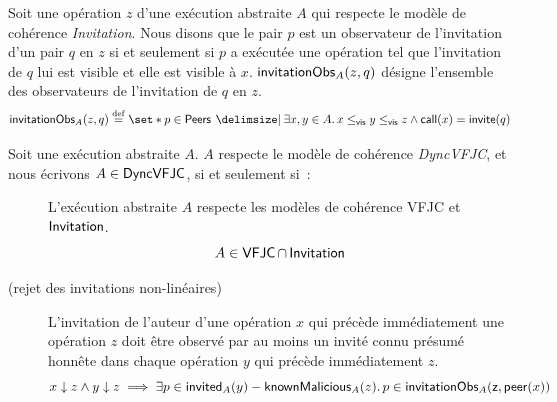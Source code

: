 \begin{definition}\label{def:invitation-obs}
Soit une opération $z$ d'une exécution abstraite $A$ qui respecte le modèle de cohérence \emph{Invitation}.
Nous disons que le pair $p$ est un observateur de l'invitation d'un pair $q$ en $z$ si et seulement si $p$ a exécutée une opération tel que l'invitation de $q$ lui est visible et elle est visible à $x$.
$\operatorname{\mathsf{invitationObs}}_A(z, q)$ désigne l'ensemble des observateurs de l'invitation de $q$ en $z$.
\begin{equation*}
    \trm{invitationObs}_A(z, q) \defeq \set*{p \in \trm{Peers} \given \exists x, y \in A \qsep x \viseq y \viseq z \land \trm{call}(x) = \trm{invite}(q)}
\end{equation*}
\end{definition}

\begin{definition}[DynVFJC]\label{def:svfjc-consistency}
Soit une exécution abstraite $A$. $A$ respecte le modèle de cohérence \emph{DyncVFJC}, et nous écrivons $A \in \operatorname{\mathsf{DyncVFJC}}$, si et seulement si~:
\begin{description}
  \item[]
  L'exécution abstraite $A$ respecte les modèles de cohérence \acs{VFJC} et $\operatorname{\mathsf{Invitation}}$.
  \begin{equation*}
    A \in \operatorname{\mathsf{VFJC}} \cap \operatorname{\mathsf{Invitation}}
  \end{equation*}
  
  \item[ (rejet des invitations non-linéaires)]
  L'invitation de l'auteur d'une opération $x$ qui précède immédiatement une opération $z$ doit être observé par au moins un invité connu présumé honnête dans chaque opération $y$ qui précède immédiatement $z$.
  \begin{equation*}
      x \downarrow z \land y \downarrow z \implies \exists p \in \operatorname{\mathsf{invited}}_A(y) - \operatorname{\mathsf{knownMalicious}}_A(z) \ldotp p \in \operatorname{\mathsf{invitationObs}}_A(\operatorname{\mathsf{z, peer}}(x))
  \end{equation*}
  \end{description}
\end{definition}

